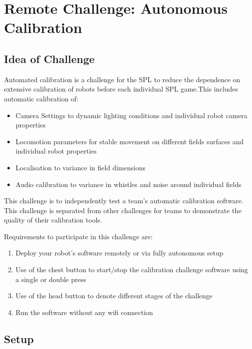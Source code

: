 \section{Remote Challenge: Autonomous Calibration}
\label{sec:AutonmousCalibration}

\subsection{Idea of Challenge}

Automated calibration is a challenge for the SPL to reduce the dependence on extensive calibration of robots before each individual SPL game.This includes automatic calibration of:
\begin{itemize}
    \item Camera Settings to dynamic lighting conditions and individual robot camera properties
    \item Locomotion parameters for stable movement on different fields surfaces and individual robot properties
    \item Localisation to variance in field dimensions
    \item Audio calibration to variance in whistles and noise around individual fields
\end{itemize}

This challenge is to independently test a team's automatic calibration software. This challenge is separated from other challenges for teams to demonstrate the quality of their calibration tools.

Requirements to participate in this challenge are:
\begin{enumerate}
    \item Deploy your robot's software remotely or via fully autonomous setup
    \item Use of the chest button to start/stop the calibration challenge software using a single or double press
    \item Use of the head button to denote different stages of the challenge
    \item Run the software without any wifi connection
\end{enumerate}

\subsection{Setup}

